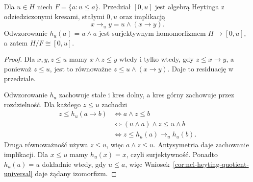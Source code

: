 \begin{stwierdzenie}
\label{prop:ncl-heyting-principal-quotient}
Dla $u\in H$ niech $F=\{a:u\leq a\}$.
Przedział $[0,u]$ jest algebrą Heytinga
z odziedziczonymi kresami, stałymi $0,u$
oraz implikacją
\[
 x\to_u y=u\wedge(x\to y).
\]
Odwzorowanie $h_u(a)=u\wedge a$ jest surjektywnym
homomorfizmem $H\to[0,u]$, a zatem
$H/F\cong[0,u]$.
\end{stwierdzenie}
\begin{proof}
Dla $x,y,z\leq u$ mamy
$x\wedge z\leq y$ wtedy i tylko wtedy, gdy
$z\leq x\to y$, a ponieważ $z\leq u$,
jest to równoważne $z\leq u\wedge(x\to y)$.
Daje to residuację w przedziale.

Odwzorowanie $h_u$ zachowuje stałe i kres dolny,
a kres górny zachowuje przez rozdzielność.
Dla każdego $z\leq u$ zachodzi
\[
\begin{aligned}
 z\leq h_u(a\to b)
 &\iff a\wedge z\leq b\\
 &\iff (u\wedge a)\wedge z\leq u\wedge b\\
 &\iff z\leq h_u(a)\to_u h_u(b).
\end{aligned}
\]
Druga równoważność używa $z\leq u$,
więc $a\wedge z\leq u$.
Antysymetria daje zachowanie implikacji.
Dla $x\leq u$ mamy $h_u(x)=x$, czyli
surjektywność. Ponadto $h_u(a)=u$ dokładnie
wtedy, gdy $u\leq a$, więc
Wniosek~\ref{cor:ncl-heyting-quotient-universal}
daje żądany izomorfizm.
\end{proof}

